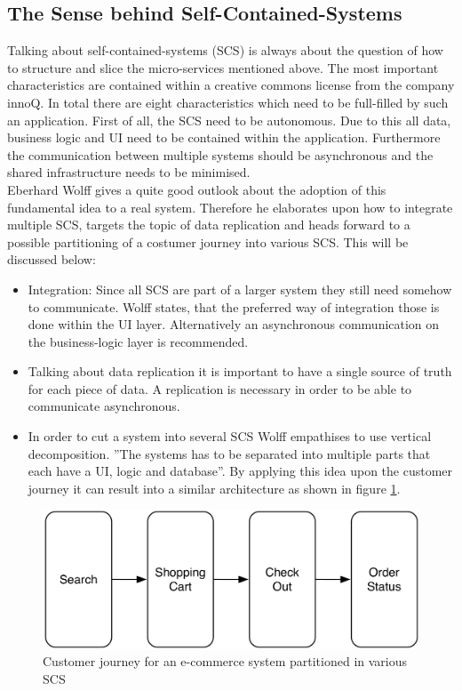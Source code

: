 \subsection{The Sense behind Self-Contained-Systems}
Talking about self-contained-systems (SCS) is always about the question of how to structure and slice the micro-services mentioned above.\newline
The most important characteristics are contained within a creative commons license from the company innoQ. In total there are eight characteristics which need to be full-filled by such an application. First of all, the SCS need to be autonomous. Due to this all data, business logic and UI need to be contained within the application. Furthermore the communication between multiple systems should be asynchronous and the shared infrastructure needs to be minimised. \cite{scs}\newline
\\
Eberhard Wolff gives a quite good outlook about the adoption of this fundamental idea to a real system. Therefore he elaborates upon how to integrate multiple SCS, targets the topic of data replication and heads forward to a possible partitioning of a costumer journey into various SCS. This will be discussed below:\newline
\begin{itemize}
    \item Integration: Since all SCS are part of a larger system they still need somehow to communicate. Wolff states, that the preferred way of integration those is done within the UI layer. Alternatively an asynchronous communication on the business-logic layer is recommended.
    \item Talking about data replication it is important to have a single source of truth for each piece of data. A replication is necessary in order to be able to communicate asynchronous.
    \item In order to cut a system into several SCS Wolff empathises to use vertical decomposition. ''The systems has to be separated into multiple parts that each have a UI, logic and database''\cite{scsWolf}. By applying this idea upon the customer journey it can result into a similar architecture as shown in figure \ref{fig:scsJourney}.
\end{itemize}
\cite{scsWolf}\newline
\begin{figure}[!htb]
    \centering
    \includegraphics[scale=0.2]{pictures/Journey.png}
    \caption{Customer journey for an e-commerce system partitioned in various SCS \cite{scsWolf}}
    \label{fig:scsJourney}
\end{figure}

